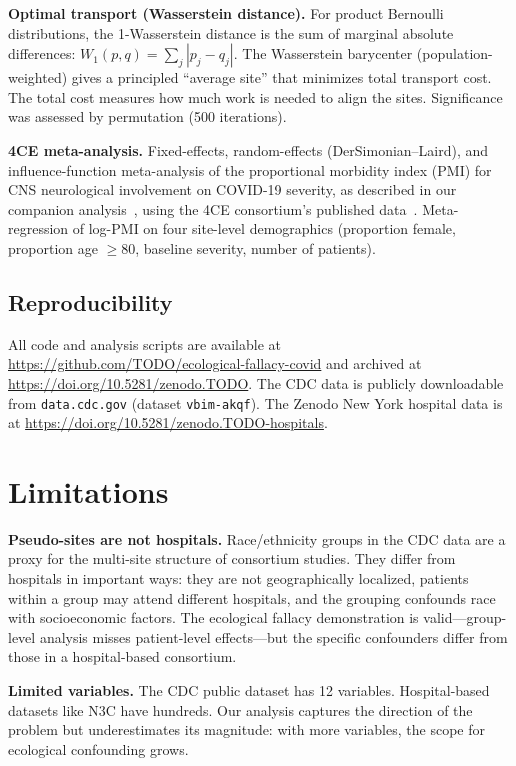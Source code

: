 \documentclass{article}
\begin{document}
\textbf{Optimal transport (Wasserstein distance).}  For product Bernoulli
distributions, the 1-Wasserstein distance is the sum of marginal absolute
differences: $W_1(p, q) = \sum_j |p_j - q_j|$.  The Wasserstein barycenter
(population-weighted) gives a principled ``average site'' that minimizes total
transport cost.  The total cost measures how much work is needed to align the
sites.  Significance was assessed by permutation (500 iterations).

\textbf{4CE meta-analysis.}  Fixed-effects, random-effects (DerSimonian--Laird),
and influence-function meta-analysis of the proportional morbidity index (PMI)
for CNS neurological involvement on COVID-19 severity, as described in our
companion analysis~\cite{tower2025sitelevel}, using the 4CE consortium's published data~\cite{four_ce_neuro2021}.  Meta-regression of log-PMI on
four site-level demographics (proportion female, proportion age $\geq 80$,
baseline severity, number of patients).


\subsection{Reproducibility}

All code and analysis scripts are available at
\url{https://github.com/TODO/ecological-fallacy-covid} and archived at
\url{https://doi.org/10.5281/zenodo.TODO}.
The CDC data is publicly downloadable from
\texttt{data.cdc.gov} (dataset \texttt{vbim-akqf}).  The Zenodo New York hospital data is at
\url{https://doi.org/10.5281/zenodo.TODO-hospitals}.


\section{Limitations}

\textbf{Pseudo-sites are not hospitals.}  Race/ethnicity groups in the CDC
data are a proxy for the multi-site structure of consortium studies.  They
differ from hospitals in important ways: they are not geographically
localized, patients within a group may attend different hospitals, and the
grouping confounds race with socioeconomic factors.  The ecological fallacy
demonstration is valid---group-level analysis misses patient-level
effects---but the specific confounders differ from those in a hospital-based
consortium.

\textbf{Limited variables.}  The CDC public dataset has 12 variables.
Hospital-based datasets like N3C have hundreds.  Our analysis captures the
direction of the problem but underestimates its magnitude: with more
variables, the scope for ecological confounding grows.
\end{document}
